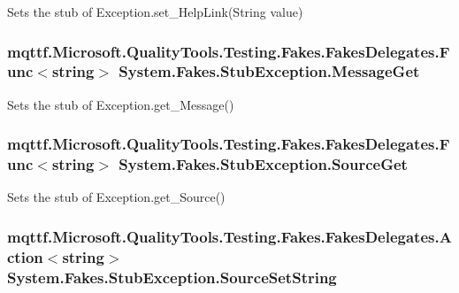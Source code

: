 Sets the stub of Exception.\-set\-\_\-\-Help\-Link(\-String value)

\hypertarget{class_system_1_1_fakes_1_1_stub_exception_a3e8d1b33793f19ae7e47383dd4be68c8}{
\subsubsection[{Message\-Get}]{\setlength{\rightskip}{0pt plus 5cm}mqttf.\-Microsoft.\-Quality\-Tools.\-Testing.\-Fakes.\-Fakes\-Delegates.\-Func$<$string$>$ System.\-Fakes.\-Stub\-Exception.\-Message\-Get}}\label{class_system_1_1_fakes_1_1_stub_exception_a3e8d1b33793f19ae7e47383dd4be68c8}


Sets the stub of Exception.\-get\-\_\-\-Message()

\hypertarget{class_system_1_1_fakes_1_1_stub_exception_af7794e11a667ae46ed5be8a4b3de92d8}{
\subsubsection[{Source\-Get}]{\setlength{\rightskip}{0pt plus 5cm}mqttf.\-Microsoft.\-Quality\-Tools.\-Testing.\-Fakes.\-Fakes\-Delegates.\-Func$<$string$>$ System.\-Fakes.\-Stub\-Exception.\-Source\-Get}}\label{class_system_1_1_fakes_1_1_stub_exception_af7794e11a667ae46ed5be8a4b3de92d8}


Sets the stub of Exception.\-get\-\_\-\-Source()

\hypertarget{class_system_1_1_fakes_1_1_stub_exception_a02b2f90c08de4f0f4201ee1d87548cc5}{
\subsubsection[{Source\-Set\-String}]{\setlength{\rightskip}{0pt plus 5cm}mqttf.\-Microsoft.\-Quality\-Tools.\-Testing.\-Fakes.\-Fakes\-Delegates.\-Action$<$string$>$ System.\-Fakes.\-Stub\-Exception.\-Source\-Set\-String}}\label{class_system_1_1_fakes_1_1_stub_exception_a02b2f90c08de4f0f4201ee1d87548cc5}


